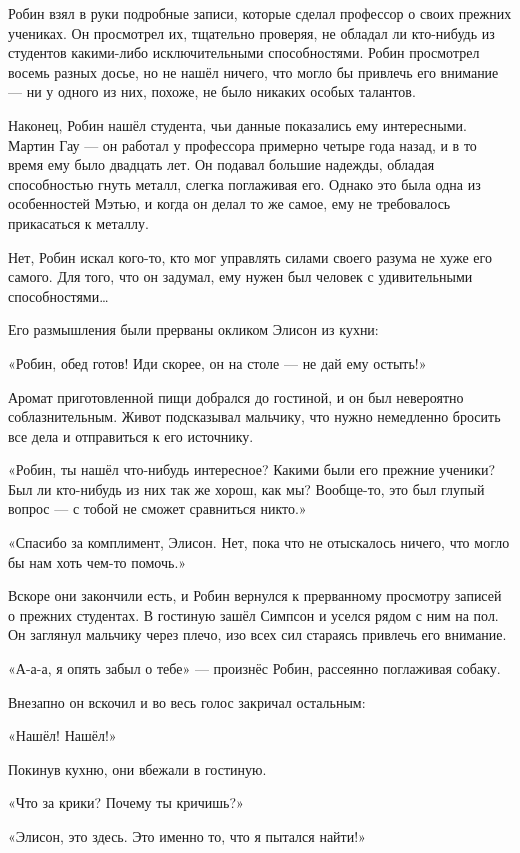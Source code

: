 \documentclass[a5paper, 9pt,
final, openany, twoside=true]{memoir}
\begin{document}
Робин взял в руки подробные записи, которые сделал профессор о своих прежних учениках. Он просмотрел их, тщательно проверяя, не обладал ли кто-нибудь из студентов какими-либо исключительными способностями. Робин просмотрел восемь разных досье, но не нашёл ничего, что могло бы привлечь его внимание — ни у одного из них, похоже, не было никаких особых талантов.

Наконец, Робин нашёл студента, чьи данные показались ему интересными. Мартин Гау — он работал у профессора примерно четыре года назад, и в то время ему было двадцать лет. Он подавал большие надежды, обладая способностью гнуть металл, слегка поглаживая его. Однако это была одна из особенностей Мэтью, и когда он делал то же самое, ему не требовалось прикасаться к металлу.

Нет, Робин искал кого-то, кто мог управлять силами своего разума не хуже его самого. Для того, что он задумал, ему нужен был человек с удивительными способностями…

Его размышления были прерваны окликом Элисон из кухни:

«Робин, обед готов! Иди скорее, он на столе — не дай ему остыть!»

Аромат приготовленной пищи добрался до гостиной, и он был невероятно соблазнительным. Живот подсказывал мальчику, что нужно немедленно бросить все дела и отправиться к его источнику.\bigskip

«Робин, ты нашёл что-нибудь интересное? Какими были его прежние ученики? Был ли кто-нибудь из них так же хорош, как мы? Вообще-то, это был глупый вопрос — с тобой не сможет сравниться никто.»

«Спасибо за комплимент, Элисон. Нет, пока что не отыскалось ничего, что могло бы нам хоть чем-то помочь.»\bigskip

Вскоре они закончили есть, и Робин вернулся к прерванному просмотру записей о прежних студентах. В гостиную зашёл Симпсон и уселся рядом с ним на пол. Он заглянул мальчику через плечо, изо всех сил стараясь привлечь его внимание.

«А-а-а, я опять забыл о тебе» — произнёс Робин, рассеянно поглаживая собаку.

Внезапно он вскочил и во весь голос закричал остальным:

«Нашёл! Нашёл!»

Покинув кухню, они вбежали в гостиную.

«Что за крики? Почему ты кричишь?»

«Элисон, это здесь. Это именно то, что я пытался найти!»
\end{document}
